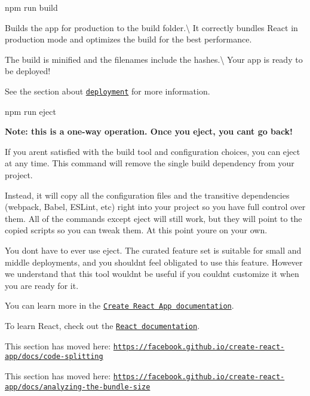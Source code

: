 \begin{DoxyCode}
npm run build
\end{DoxyCode}


Builds the app for production to the {\ttfamily build} folder.\textbackslash{} It correctly bundles React in production mode and optimizes the build for the best performance.

The build is minified and the filenames include the hashes.\textbackslash{} Your app is ready to be deployed!

See the section about \href{https://facebook.github.io/create-react-app/docs/deployment}{\tt deployment} for more information.


\begin{DoxyCode}
npm run eject
\end{DoxyCode}


{\bfseries Note\+: this is a one-\/way operation. Once you {\ttfamily eject}, you can\textquotesingle{}t go back!}

If you aren\textquotesingle{}t satisfied with the build tool and configuration choices, you can {\ttfamily eject} at any time. This command will remove the single build dependency from your project.

Instead, it will copy all the configuration files and the transitive dependencies (webpack, Babel, E\+S\+Lint, etc) right into your project so you have full control over them. All of the commands except {\ttfamily eject} will still work, but they will point to the copied scripts so you can tweak them. At this point you\textquotesingle{}re on your own.

You don\textquotesingle{}t have to ever use {\ttfamily eject}. The curated feature set is suitable for small and middle deployments, and you shouldn\textquotesingle{}t feel obligated to use this feature. However we understand that this tool wouldn\textquotesingle{}t be useful if you couldn\textquotesingle{}t customize it when you are ready for it.

You can learn more in the \href{https://facebook.github.io/create-react-app/docs/getting-started}{\tt Create React App documentation}.

To learn React, check out the \href{https://reactjs.org/}{\tt React documentation}.

This section has moved here\+: \href{https://facebook.github.io/create-react-app/docs/code-splitting}{\tt https\+://facebook.\+github.\+io/create-\/react-\/app/docs/code-\/splitting}

This section has moved here\+: \href{https://facebook.github.io/create-react-app/docs/analyzing-the-bundle-size}{\tt https\+://facebook.\+github.\+io/create-\/react-\/app/docs/analyzing-\/the-\/bundle-\/size}

